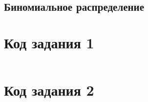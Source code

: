 \documentclass[bachelor, och, labwork]{SCWorks}
\begin{document}
\subsection{Биномиальное распределение}

\newpage
\appendix
    \section{Код задания 1}
    \inputminted[fontsize=\footnotesize]{text}{main.cpp}

    \section{Код задания 2}
    \inputminted[fontsize=\footnotesize]{text}{main2.cpp}




\end{document}
